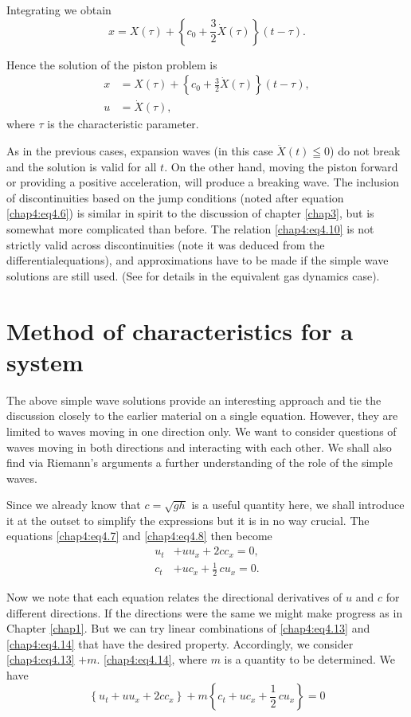 Integrating we obtain
$$
x=X(\tau)+\left\{c_0+\frac{3}{2}\dot{X}(\tau)\right\}(t-\tau).
$$

Hence the solution of the piston problem is 
\begin{align*}
x &= X(\tau)+\left\{c_0+\frac{3}{2}\dot{X}(\tau)\right\}(t-\tau),\\
u &= \dot{X}(\tau),
\end{align*}
where $\tau$ is the characteristic parameter.

As in the previous cases, expansion waves (in this case $\ddot{X}(t)\leqq 0$) do not break and the solution is valid for all $t$. On the other hand, moving the piston forward or providing a positive acceleration, will produce a breaking wave. The inclusion of discontinuities based on the jump conditions (noted after equation \eqref{chap4:eq4.6}) is similar in spirit to the discussion of chapter \ref{chap3}, but is somewhat more complicated than before. The relation \eqref{chap4:eq4.10} is not strictly valid across discontinuities (note it was deduced from the differential\pageoriginale equations), and approximations have to be made if the simple wave solutions are still used. (See \cite{key1} for details in the equivalent gas dynamics case).

\section{Method of characteristics for a system}\label{chap4:sec4.3}

The above simple wave solutions provide an interesting approach and tie the discussion closely to the earlier material on a single equation. However, they are limited to waves moving in one direction only. We want to consider questions of waves moving in both directions and interacting with each other. We shall also find via Riemann's arguments a further understanding of the role of the simple waves.

Since we already know that $c=\sqrt{gh}$ is a useful quantity here, we shall introduce it at the outset to simplify the expressions but it is in no way crucial. The equations \eqref{chap4:eq4.7} and \eqref{chap4:eq4.8} then become
\begin{align}
u_t &+uu_x+2cc_x=0,\tag{4.13}\label{chap4:eq4.13}\\
c_t &+ uc_x+\frac{1}{2}\, cu_x=0.\tag{4.14}\label{chap4:eq4.14}
\end{align}

Now we note that each equation relates the directional derivatives of $u$ and $c$ for different directions. If the directions were the same we might make progress as in Chapter \ref{chap1}. But we can try linear combinations of \eqref{chap4:eq4.13} and \eqref{chap4:eq4.14} that have the desired property. Accordingly, we consider \eqref{chap4:eq4.13} $+m$. \eqref{chap4:eq4.14}, where $m$ is a quantity to be determined. We have 
\begin{equation}
\left\{u_t+uu_x+2cc_x\right\}+m\left\{c_t+uc_x+\frac{1}{2}\,cu_x\right\} =0\tag{4.15}\label{chap4:eq4.15}
\end{equation}\pageoriginale

